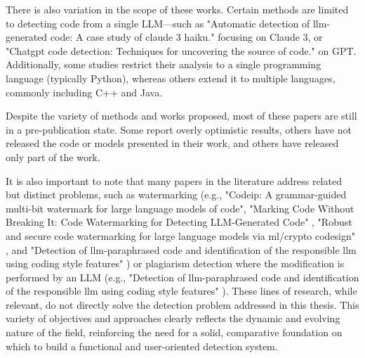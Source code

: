 There is also variation in the scope of these works. 
Certain methods are limited to detecting code from a single LLM—such as 
"Automatic detection of llm-generated code: A case study of claude 
3 haiku."\cite{anthropic2024model} focusing on Claude 3, 
or "Chatgpt code detection: Techniques for uncovering the source of code." 
\cite{oedingen2024chatgpt} on GPT. 
Additionally, some studies restrict their analysis to a single programming 
language (typically Python), whereas others extend it to multiple 
languages, commonly including C++ and Java.

Despite the variety of methods and works proposed, 
most of these papers are still in a pre-publication state. 
Some report overly optimistic results, others have not released the 
code or models presented in their work, and others have released only 
part of the work.

It is also important to note that many papers in the literature address 
related but distinct problems, such as watermarking 
(e.g., "Codeip: A grammar-guided multi-bit watermark for large language 
models of code"\cite{guan2024codeip}, 
"Marking Code Without Breaking It: Code Watermarking for 
Detecting LLM-Generated Code" \cite{kim2025marking}, 
"Robust and secure code watermarking for large 
language models via ml/crypto codesign" \cite{zhang2025robust}, 
and "Detection of llm-paraphrased code and identification of the 
responsible llm using coding style features" \cite{park2025detection}) 
or plagiarism detection where the modification 
is performed by an LLM (e.g., "Detection of llm-paraphrased code and 
identification of the responsible llm using coding style features" 
\cite{park2025detection}). These lines of 
research, while relevant, do not directly solve the detection problem 
addressed in this thesis. This variety of objectives and approaches 
clearly reflects the dynamic and evolving nature of the field, reinforcing 
the need for a solid, comparative foundation on which to build a functional 
and user-oriented detection system.